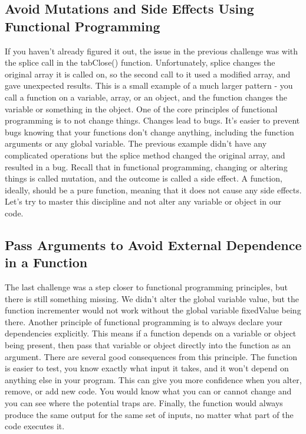 \documentclass{article}%
\begin{document}
%
\subsection{Avoid Mutations and Side Effects Using Functional Programming}%
\label{subsec:AvoidMutationsandSideEffectsUsingFunctionalProgramming}%
If you haven't already figured it out, the issue in the previous challenge was with the splice call in the tabClose() function. Unfortunately, splice changes the original array it is called on, so the second call to it used a modified array, and gave unexpected results.\newline%
This is a small example of a much larger pattern {-} you call a function on a variable, array, or an object, and the function changes the variable or something in the object.\newline%
One of the core principles of functional programming is to not change things. Changes lead to bugs. It's easier to prevent bugs knowing that your functions don't change anything, including the function arguments or any global variable.\newline%
The previous example didn't have any complicated operations but the splice method changed the original array, and resulted in a bug.\newline%
Recall that in functional programming, changing or altering things is called mutation, and the outcome is called a side effect. A function, ideally, should be a pure function, meaning that it does not cause any side effects.\newline%
Let's try to master this discipline and not alter any variable or object in our code.\newline%

%
\subsection{Pass Arguments to Avoid External Dependence in a Function}%
\label{subsec:PassArgumentstoAvoidExternalDependenceinaFunction}%
The last challenge was a step closer to functional programming principles, but there is still something missing.\newline%
We didn't alter the global variable value, but the function incrementer would not work without the global variable fixedValue being there.\newline%
Another principle of functional programming is to always declare your dependencies explicitly. This means if a function depends on a variable or object being present, then pass that variable or object directly into the function as an argument.\newline%
There are several good consequences from this principle. The function is easier to test, you know exactly what input it takes, and it won't depend on anything else in your program.\newline%
This can give you more confidence when you alter, remove, or add new code. You would know what you can or cannot change and you can see where the potential traps are.\newline%
Finally, the function would always produce the same output for the same set of inputs, no matter what part of the code executes it.\newline%
\end{document}
